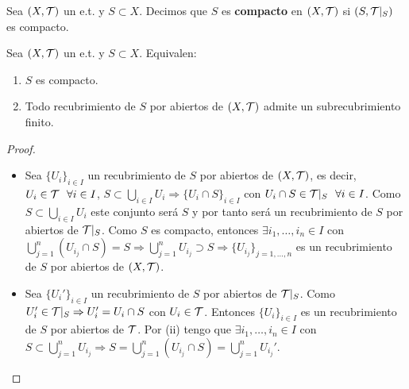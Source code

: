 \begin{definicion}
    Sea $(X, \mathcal{T})$ un e.t. y $S\subset X$. Decimos que $S$ es \textbf{compacto} en $(X, \mathcal{T})$ si $(S, \mathcal{T}|_S)$ es compacto.
    \endsquare
\end{definicion}

\begin{prop}
    Sea $(X, \mathcal{T})$ un e.t. y $S\subset X$. Equivalen:
    \begin{enumerate}
        \item[(i)] $S$ es compacto.
        \item[(ii)] Todo recubrimiento de $S$ por abiertos de $(X, \mathcal{T})$ admite un subrecubrimiento finito. 
    \end{enumerate}
    \begin{proof}\
        \begin{itemize}
            \item[(i)$\Rightarrow$(ii) )] Sea $\{U_i\}_{i\in I}$ un recubrimiento de $S$ por abiertos de $(X, \mathcal{T})$, es decir, $U_i\in \mathcal{T}\ \ \forall i \in I$, $S\subset \bigcup\limits_{i\in I}U_i \Rightarrow \{U_i\cap S\}_{i\in I}$ con $U_i\cap S\in \mathcal{T}|_S\ \ \forall i \in I$. Como $S\subset \bigcup\limits_{i\in I}U_i$ este conjunto será $S$ y por tanto será un recubrimiento de $S$ por abiertos de $\mathcal{T}|_S$. Como $S$ es compacto, entonces $\exists i_1,\dots,i_n\in I$ con $\bigcup\limits_{j=1}^{n}(U_{i_j}\cap S)=S \Rightarrow \bigcup\limits_{j=1}^{n}U_{i_j}\supset S \Rightarrow \{U_{i_j}\}_{j=1,\dots,n}$ es un recubrimiento de $S$ por abiertos de $(X, \mathcal{T})$.
            \item[(ii)$\Rightarrow$(i) )] Sea $\{U_i'\}_{i\in I}$ un recubrimiento de $S$ por abiertos de $\mathcal{T}|_S$. Como $U_i'\in \mathcal{T}|_S\Rightarrow U_i'=U_i\cap S$ con $U_i\in \mathcal{T}$. Entonces $\{U_i\}_{i\in I}$ es un recubrimiento de $S$ por abiertos de $\mathcal{T}$. Por (ii) tengo que $\exists i_1,\dots,i_n\in I$ con $S\subset \bigcup\limits_{j=1}^{n}U_{i_j} \Rightarrow S = \bigcup\limits_{j=1}^{n}(U_{i_j}\cap S) = \bigcup\limits_{j=1}^{n}U_{i_j}'$.
        \end{itemize}
    \end{proof}
\end{prop}


